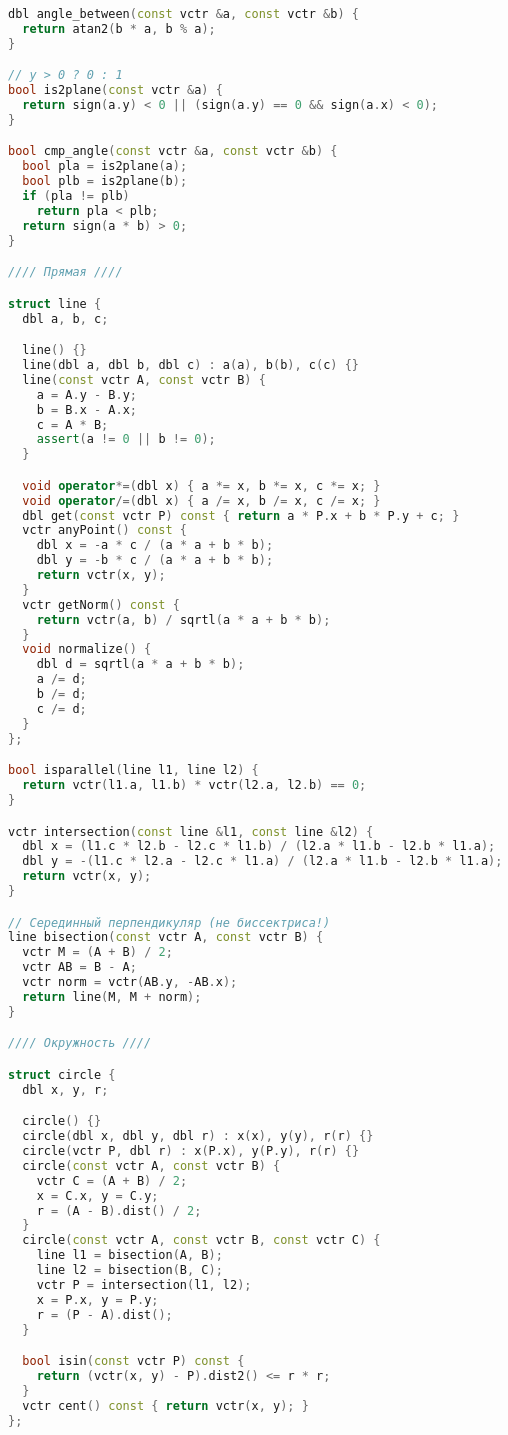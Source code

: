 \documentclass[10pt,a4paper,landscape,twosided]{extarticle}
\begin{document}
\begin{multicols*}{3}
\begin{lstlisting}[language=C++]
dbl angle_between(const vctr &a, const vctr &b) {
  return atan2(b * a, b % a);
}

// y > 0 ? 0 : 1
bool is2plane(const vctr &a) {
  return sign(a.y) < 0 || (sign(a.y) == 0 && sign(a.x) < 0);
}

bool cmp_angle(const vctr &a, const vctr &b) {
  bool pla = is2plane(a);
  bool plb = is2plane(b);
  if (pla != plb)
    return pla < plb;
  return sign(a * b) > 0;
}

//// Прямая ////

struct line {
  dbl a, b, c;

  line() {}
  line(dbl a, dbl b, dbl c) : a(a), b(b), c(c) {}
  line(const vctr A, const vctr B) {
    a = A.y - B.y;
    b = B.x - A.x;
    c = A * B;
    assert(a != 0 || b != 0);
  }

  void operator*=(dbl x) { a *= x, b *= x, c *= x; }
  void operator/=(dbl x) { a /= x, b /= x, c /= x; }
  dbl get(const vctr P) const { return a * P.x + b * P.y + c; }
  vctr anyPoint() const {
    dbl x = -a * c / (a * a + b * b);
    dbl y = -b * c / (a * a + b * b);
    return vctr(x, y);
  }
  vctr getNorm() const {
    return vctr(a, b) / sqrtl(a * a + b * b);
  }
  void normalize() {
    dbl d = sqrtl(a * a + b * b);
    a /= d;
    b /= d;
    c /= d;
  }
};

bool isparallel(line l1, line l2) {
  return vctr(l1.a, l1.b) * vctr(l2.a, l2.b) == 0;
}

vctr intersection(const line &l1, const line &l2) {
  dbl x = (l1.c * l2.b - l2.c * l1.b) / (l2.a * l1.b - l2.b * l1.a);
  dbl y = -(l1.c * l2.a - l2.c * l1.a) / (l2.a * l1.b - l2.b * l1.a);
  return vctr(x, y);
}

// Серединный перпендикуляр (не биссектриса!)
line bisection(const vctr A, const vctr B) {
  vctr M = (A + B) / 2;
  vctr AB = B - A;
  vctr norm = vctr(AB.y, -AB.x);
  return line(M, M + norm);
}

//// Окружность ////

struct circle {
  dbl x, y, r;

  circle() {}
  circle(dbl x, dbl y, dbl r) : x(x), y(y), r(r) {}
  circle(vctr P, dbl r) : x(P.x), y(P.y), r(r) {}
  circle(const vctr A, const vctr B) {
    vctr C = (A + B) / 2;
    x = C.x, y = C.y;
    r = (A - B).dist() / 2;
  }
  circle(const vctr A, const vctr B, const vctr C) {
    line l1 = bisection(A, B);
    line l2 = bisection(B, C);
    vctr P = intersection(l1, l2);
    x = P.x, y = P.y;
    r = (P - A).dist();
  }

  bool isin(const vctr P) const {
    return (vctr(x, y) - P).dist2() <= r * r;
  }
  vctr cent() const { return vctr(x, y); }
};



\end{lstlisting}
\end{multicols*}
\end{document}
